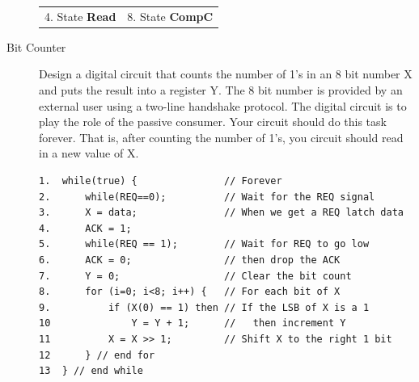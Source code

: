 \begin{description}
\begin{tabular}{ll}
4. State {\bf Read}                                  & 8. State {\bf CompC} \\
\end{tabular}

\pagebreak

\item[Bit Counter]
Design a digital circuit that counts the number of 1's in an
8 bit number X and puts the result into a register Y.
The 8 bit number is provided by an external user using a two-line
handshake protocol. The digital circuit is to play the role of the
passive consumer.  Your circuit should do this task forever.  That
is, after counting the number of 1's, you circuit should read
in a new value of X.


\begin{verbatim}
1.  while(true) {               // Forever
2.      while(REQ==0);          // Wait for the REQ signal
3.      X = data;               // When we get a REQ latch data
4.      ACK = 1;		
5.      while(REQ == 1);        // Wait for REQ to go low
6.      ACK = 0;                // then drop the ACK
7.      Y = 0;                  // Clear the bit count
8.      for (i=0; i<8; i++) {   // For each bit of X
9.          if (X(0) == 1) then // If the LSB of X is a 1  
10              Y = Y + 1;      //   then increment Y
11          X = X >> 1;         // Shift X to the right 1 bit
12      } // end for
13  } // end while
\end{verbatim}



\end{description}
